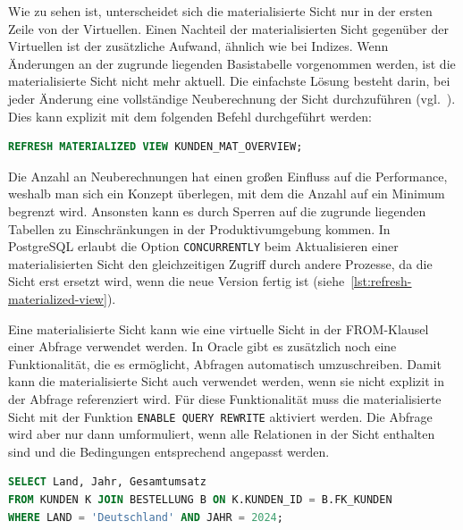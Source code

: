 Wie zu sehen ist, unterscheidet sich die materialisierte Sicht nur in der ersten Zeile von der Virtuellen.
Einen Nachteil der materialisierten Sicht gegenüber der Virtuellen ist der zusätzliche Aufwand, ähnlich wie bei Indizes.
Wenn Änderungen an der zugrunde liegenden Basistabelle vorgenommen werden, ist die materialisierte Sicht nicht mehr aktuell.
Die einfachste Lösung besteht darin, bei jeder Änderung eine vollständige Neuberechnung der Sicht durchzuführen (vgl.\ \cite[S. 608]{silberschatz2011database}).
Dies kann explizit mit dem folgenden Befehl durchgeführt werden:

\vspace{-5pt}
\begin{lstlisting}[language=SQL,caption=Aktualisierung der materialisierten Sicht,label={lst:refresh-materialized-view}]
REFRESH MATERIALIZED VIEW KUNDEN_MAT_OVERVIEW;
\end{lstlisting}
\vspace{-5pt}

Die Anzahl an Neuberechnungen hat einen großen Einfluss auf die Performance, weshalb man sich ein Konzept überlegen, mit dem die Anzahl auf ein Minimum begrenzt wird.
Ansonsten kann es durch Sperren auf die zugrunde liegenden Tabellen zu Einschränkungen in der Produktivumgebung kommen.
In PostgreSQL erlaubt die Option \texttt{CONCURRENTLY} beim Aktualisieren einer materialisierten Sicht den gleichzeitigen Zugriff durch andere Prozesse, da die Sicht erst ersetzt wird, wenn die neue Version fertig ist (siehe~\ref{lst:refresh-materialized-view}).

Eine materialisierte Sicht kann wie eine virtuelle Sicht in der FROM-Klausel einer Abfrage verwendet werden.
In Oracle gibt es zusätzlich noch eine Funktionalität, die es ermöglicht, Abfragen automatisch umzuschreiben.
Damit kann die materialisierte Sicht auch verwendet werden, wenn sie nicht explizit in der Abfrage referenziert wird.
Für diese Funktionalität muss die materialisierte Sicht mit der Funktion \texttt{ENABLE QUERY REWRITE} aktiviert werden.
Die Abfrage wird aber nur dann umformuliert, wenn alle Relationen in der Sicht enthalten sind und die Bedingungen entsprechend angepasst werden.

\vspace{-5pt}
\begin{lstlisting}[language=SQL,caption=Select mit View,label={lst:select-with-mat-view}]
SELECT Land, Jahr, Gesamtumsatz
FROM KUNDEN K JOIN BESTELLUNG B ON K.KUNDEN_ID = B.FK_KUNDEN
WHERE LAND = 'Deutschland' AND JAHR = 2024;
\end{lstlisting}
\vspace{-5pt}

